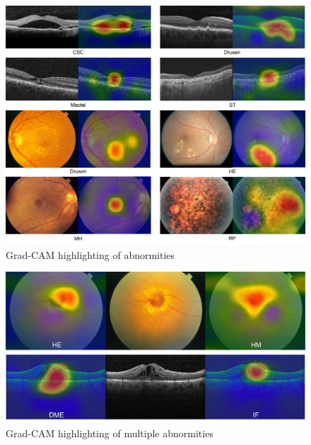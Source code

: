\documentclass{article}
\begin{document}
	\begin{figure}[htbp]
		\centering
		\includegraphics[width=\linewidth]{Figs/abnormity_gradCAM.pdf}
		\caption{Grad-CAM highlighting of abnormities}
		\vspace{0.3cm}
		\label{fig:gradCAM}
	\end{figure}
	
	\begin{figure}[htbp]
		\centering
		\includegraphics[width=0.8\linewidth]{Figs/abnormity_gradCAM_multiple_abnormities.pdf}
		\caption{Grad-CAM highlighting of multiple abnormities}
		\vspace{0.3cm}
		\label{fig:gradCAM_multi_abnormity}
	\end{figure}
	
		\vspace{1.5cm}
	
\end{document}
